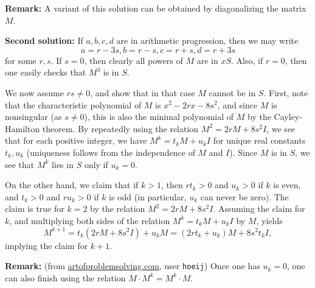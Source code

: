 \documentclass[amssymb,twocolumn,pra,10pt,aps]{revtex4-1}
\begin{document}
\begin{itemize}
\noindent
\textbf{Remark:}
A variant of this solution can be obtained by diagonalizing the matrix $M$.

\textbf{Second solution:}
If $a,b,c,d$ are in arithmetic progression, then we may write
\[
a = r-3s, b=r-s, c=r+s, d=r+3s
\]
for some $r,s$. If $s=0$, then clearly all powers of $M$ are in $xS$. Also, if $r=0$, then one easily checks that $M^3$ is in $S$.

We now assume $rs\neq 0$, and show that in that case $M$ cannot be in $S$. First, note that the characteristic polynomial of $M$ is $x^2-2rx-8s^2$, and since $M$ is nonsingular (as $s\neq 0$), this is also the minimal polynomial of $M$ by the Cayley-Hamilton theorem.  By repeatedly using the relation $M^2=2rM+8s^2I$, we see that for each positive integer, we have $M^k = t_k M + u_k I$ for unique real constants $t_k, u_k$ (uniqueness follows from the independence of $M$ and $I$).  Since $M$ is in $S$, we see that $M^k$ lies in $S$ only if $u_k=0$.

On the other hand, we claim that if $k>1$, then $rt_k>0$ and $u_k>0$ if $k$ is even, and $t_k>0$ and $ru_k>0$ if $k$ is odd (in particular, $u_k$ can never be zero).  The claim is true for $k=2$ by the relation $M^2=2rM+8s^2I$. Assuming the claim for $k$, and multiplying both sides of the relation $M^k = t_k M + u_k I$ by $M$, yields
\[
M^{k+1} = t_k (2rM+8s^2I) + u_k M = (2rt_k+u_k) M + 8s^2t_k I,
\]
implying the claim for $k+1$.

\noindent
\textbf{Remark:}
(from \url{artofproblemsolving.com}, user \texttt{hoeij})
Once one has $u_k = 0$, one can also finish using the relation $M \cdot M^k = M^k \cdot M$.


\end{itemize}
\end{document}
